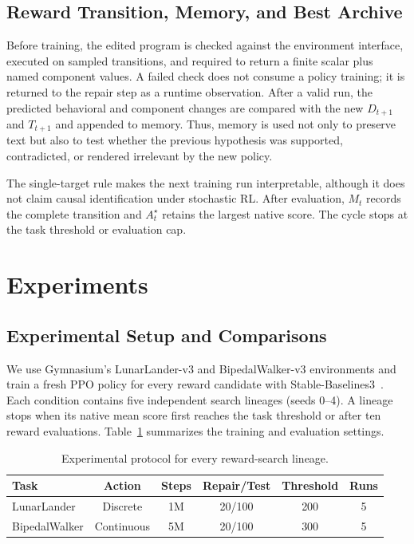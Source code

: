 \documentclass[conference]{IEEEtran}
\begin{document}
\subsection{Reward Transition, Memory, and Best Archive}
Before training, the edited program is checked against the environment
interface, executed on sampled transitions, and required to return a finite
scalar plus named component values. A failed check does not consume a policy
training; it is returned to the repair step as a runtime observation. After a
valid run, the predicted behavioral and component changes are compared with
the new $D_{t+1}$ and $T_{t+1}$ and appended to memory. Thus, memory is used not
only to preserve text but also to test whether the previous hypothesis was
supported, contradicted, or rendered irrelevant by the new policy.

The single-target rule makes the next training run interpretable, although it
does not claim causal identification under stochastic RL. After evaluation,
$M_t$ records the complete transition and $A_t^\star$ retains the largest
native score. The cycle stops at the task threshold or evaluation cap.

\section{Experiments}

\subsection{Experimental Setup and Comparisons}
We use Gymnasium's LunarLander-v3 and BipedalWalker-v3 environments and train a
fresh PPO policy for every reward candidate with
Stable-Baselines3~\cite{ppo,sb3}. Each condition contains five
independent search lineages (seeds 0--4). A lineage stops when its native mean
score first reaches the task threshold or after ten reward evaluations.
Table~\ref{tab:protocol} summarizes the training and evaluation settings.

\begin{table}[H]
\caption{Experimental protocol for every reward-search lineage.}
\label{tab:protocol}
\centering
\scriptsize
\setlength{\tabcolsep}{2.7pt}
\begin{tabular}{lccccc}
\toprule
Task & Action & Steps & Repair/Test & Threshold & Runs \\
\midrule
LunarLander & Discrete & 1M & 20/100 & 200 & 5 \\
BipedalWalker & Continuous & 5M & 20/100 & 300 & 5 \\
\bottomrule
\end{tabular}
\end{table}
\end{document}
